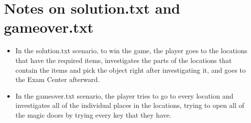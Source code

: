 \documentclass[11pt]{article}
\begin{document}
\section*{Notes on solution.txt and gameover.txt}
\begin{itemize}
    \item In the solution.txt scenario, to win the game, the player goes to the locations that have the required items, investigates the parts of the locations that contain the items and pick the object right after investigating it, and goes to the Exam Center afterward.
    \item In the gameover.txt scenario, the player tries to go to every location and investigates all of the individual places in the locations, trying to open all of the magic doors by trying every key that they have.
\end{itemize}
\end{document}
